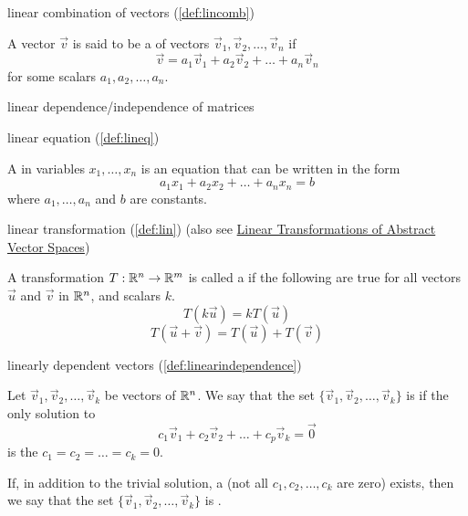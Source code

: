 \documentclass{ximera}
\begin{document}
linear combination of vectors (\ref{def:lincomb})
\begin{expandable}
    A vector $\vec{v}$ is said to be a  of vectors $\vec{v}_1, \vec{v}_2,\ldots, \vec{v}_n$ if 
$$\vec{v}=a_1\vec{v}_1+ a_2\vec{v}_2+\ldots + a_n\vec{v}_n$$
for some scalars $a_1, a_2, \ldots ,a_n$.
\end{expandable}

linear dependence/independence of matrices

linear equation (\ref{def:lineq})
\begin{expandable}
    A  in variables $x_1, \ldots, x_n$ is an equation that can be written in the form
$$a_1x_1+a_2x_2+\ldots +a_nx_n=b$$
where $a_1,\ldots ,a_n$ and $b$ are constants.
\end{expandable}

linear transformation (\ref{def:lin}) (also see \href{https://ximera.osu.edu/oerlinalg/LinearAlgebra/LTR-0022/main}{Linear Transformations of Abstract Vector Spaces})
\begin{expandable}
    A transformation $T:\mathbb{R}^n\rightarrow \mathbb{R}^m$ is called a  if the following are true for all vectors $\vec{u}$ and $\vec{v}$ in $\mathbb{R}^n$, and scalars $k$.
\begin{equation}\label{eq:lintrans1}
T(k\vec{u})= kT(\vec{u})
\end{equation}
\begin{equation}\label{eq:lintrans2}
T(\vec{u}+\vec{v})= T(\vec{u})+T(\vec{v})
\end{equation}
\end{expandable}

linearly dependent vectors (\ref{def:linearindependence})
\begin{expandable}
    Let $\vec{v}_1, \vec{v}_2,\ldots ,\vec{v}_k$ be vectors of $\mathbb{R}^n$.  We say that the set $\{\vec{v}_1, \vec{v}_2,\ldots ,\vec{v}_k\}$ is  if the only solution to 
\begin{equation}\label{eq:defLinInd}c_1\vec{v}_1+c_2\vec{v}_2+\ldots +c_p\vec{v}_k=\vec{0}\end{equation}
is the  $c_1=c_2=\ldots =c_k=0$.

If, in addition to the trivial solution, a  (not all $c_1, c_2,\ldots ,c_k$ are zero) exists, then we say that the set $\{\vec{v}_1, \vec{v}_2,\ldots ,\vec{v}_k\}$ is .
\end{expandable}
\end{document}
